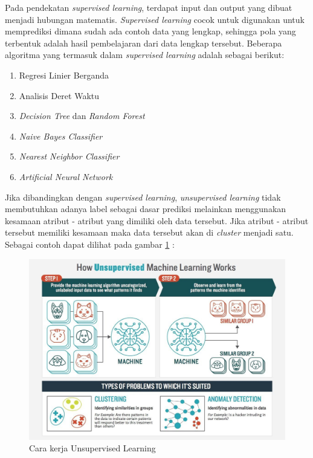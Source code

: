 \vspace{1ex}

\par Pada pendekatan \textit{supervised learning}, terdapat input dan output yang dibuat menjadi hubungan matematis. \textit{Supervised learning} cocok untuk digunakan untuk memprediksi dimana sudah ada contoh data yang lengkap, sehingga pola yang terbentuk adalah hasil pembelajaran dari data lengkap tersebut. Beberapa algoritma yang termasuk dalam \textit{supervised learning} adalah sebagai berikut:
\begin{enumerate}
	\vspace{-2mm}
	\item Regresi Linier Berganda
	\vspace{-2mm}
	\item Analisis Deret Waktu
	\vspace{-2mm}
	\item \textit{Decision Tree} dan \textit{Random Forest}
	\vspace{-2mm}
	\item \textit{Naive Bayes Classifier}
	\vspace{-2mm}
	\item \textit{Nearest Neighbor Classifier}
	\vspace{-2mm}
	\item \textit{Artificial Neural Network}
	\vspace{-1mm}
\end{enumerate}
\par Jika dibandingkan dengan \textit{supervised learning}, \textit{unsupervised learning} tidak membutuhkan adanya label sebagai dasar prediksi melainkan menggunakan kesamaan atribut - atribut yang dimiliki oleh data tersebut. Jika atribut - atribut tersebut memiliki kesamaan maka data tersebut akan di \textit{cluster} menjadi satu. Sebagai contoh dapat dilihat pada gambar \ref{fig:Unsupervised} :

\begin{figure}[h!]
	\centering
	\includegraphics[scale=0.18]{img/unsupervised.jpg}
	\caption{Cara kerja Unsupervised Learning \cite{cit:8}}
	\label{fig:Unsupervised}
\end{figure}

